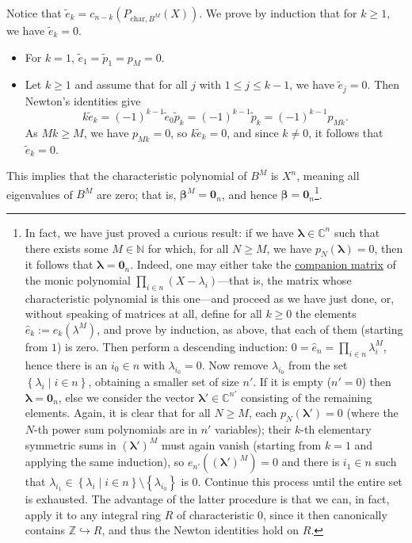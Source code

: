 \documentclass[11pt, a4paper, oneside]{article}
\theoremstyle{remark}
\theoremstyle{lemma}
\begin{document}
Notice that \( \tilde{e}_k = c_{n-k}\left( P_{\text{char},B^M}\left( X \right) \right) \).  
We prove by induction that for \( k \geq 1 \), we have \( \tilde{e}_k = 0 \).  
\begin{itemize}
\item For \( k = 1 \), \( \tilde{e}_1 = \tilde{p}_1 = p_M = 0 \).
\item Let \( k \geq 1 \) and assume that for all \( j \) with \( 1 \leq j \leq k - 1 \), we have \( \tilde{e}_j = 0 \). Then Newton's identities give
\[
k \tilde{e}_k = (-1)^{k-1} \tilde{e}_0 \tilde{p}_k = (-1)^{k-1} \tilde{p}_k = (-1)^{k-1} p_{Mk}.
\]
As \( Mk \geq M \), we have \( p_{Mk} = 0 \), so \( k \tilde{e}_k = 0 \), and since \( k \neq 0 \), it follows that \( \tilde{e}_k = 0 \).
\end{itemize}
This implies that the characteristic polynomial of \( B^M \) is \( X^n \), meaning all eigenvalues of \( B^M \) are zero; that is, \( \boldsymbol{\beta}^M = \mathbf{0}_n \), and hence \( \boldsymbol{\beta} = \mathbf{0}_n \)\footnote{In fact, we have just proved a curious result: if we have \( \boldsymbol{\lambda} \in \mathbb{C}^n \) such that there exists some \( M \in \mathbb{N} \) for which, for all \( N \geq M \), we have \( p_N\left( \boldsymbol{\lambda} \right) = 0 \), then it follows that \( \boldsymbol{\lambda} = \mathbf{0}_n \). Indeed, one may either take the \href{https://en.wikipedia.org/wiki/Companion_matrix}{companion matrix} of the monic polynomial \( \prod_{i \in n} \left( X - \lambda_i \right) \)—that is, the matrix whose characteristic polynomial is this one—and proceed as we have just done, or, without speaking of matrices at all, define for all \( k \geq 0 \) the elements \( \hat{e}_k := e_k\left( \lambda^M \right) \), and prove by induction, as above, that each of them (starting from \( 1 \)) is zero. Then perform a descending induction: \( 0 = \hat{e}_n = \prod_{i \in n} \lambda_i^M \), hence there is an \( i_0 \in n \) with \( \lambda_{i_0} = 0 \). Now remove \( \lambda_{i_0} \) from the set \( \left\{ \lambda_i \mid i \in n \right\} \), obtaining a smaller set of size \(n'\). If it is empty ($n'=0$) then $\boldsymbol{\lambda}=\mathbf{0}_{n}$, else we consider the vector \( \boldsymbol{\lambda}'\in\mathbb{C}^{n'} \) consisting of the remaining elements. Again, it is clear that for all \( N \geq M \), each \( p_N\left( \boldsymbol{\lambda}' \right) = 0 \) (where the \( N \)-th power sum polynomials are in \(n'\) variables); their \( k \)-th elementary symmetric sums in \(\left(\boldsymbol{\lambda}'\right)^{M}\) must again vanish (starting from \( k = 1 \) and applying the same induction), so $e_{n'}\left(\left(\boldsymbol{\lambda}'\right)^{M}\right)=0$ and there is $i_1\in n$ such that \( \lambda_{i_1} \in \left\{ \lambda_i \mid i \in n \right\} \setminus \left\{ \lambda_{i_0} \right\} \) is \( 0 \). Continue this process until the entire set is exhausted. The advantage of the latter procedure is that we can, in fact, apply it to any integral ring \( R \) of characteristic \( 0 \), since it then canonically contains \( \mathbb{Z} \hookrightarrow R \), and thus the Newton identities hold on $R$.
}.
\end{document}
